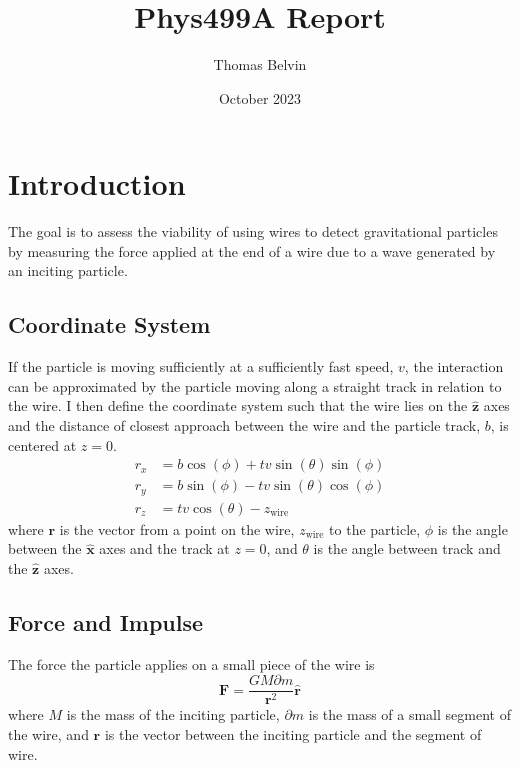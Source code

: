 \documentclass{report}
\title{Phys499A Report}
\author{Thomas Belvin}
\date{October 2023}
\begin{document}
\maketitle
\chapter*{Introduction}
The goal is to assess the viability of using wires to detect gravitational particles 
by measuring the force applied at the end of a wire due to a wave generated by an inciting
particle.
\section*{Coordinate System}
If the particle is moving sufficiently at a sufficiently fast speed, $v$, the interaction can be approximated by the 
particle moving along a straight track in relation to the wire. I then define the coordinate system
such that the wire lies on the $\mathbf{\hat z}$ axes and the distance of closest approach between the 
wire and the particle track, $b$, is centered at $z = 0$. 
\begin{align}
    r_x &= b \cos (\phi )+t v \sin (\theta ) \sin (\phi )\\
    r_y &= b \sin (\phi )-t v \sin (\theta ) \cos (\phi )\\
    r_z &= t v \cos (\theta )-z_{\text{wire}}
\end{align}
where $\mathbf{r}$ is the vector from a point on the wire, $z_{\text{wire}}$ to the particle, $\phi$ is the angle between
the $\mathbf{\hat x}$ axes and the track at $z = 0$, and $\theta$ is the angle between track and the $\mathbf{\hat z}$ axes.
\section*{Force and Impulse}
The force the particle applies on a small piece of the wire is
\begin{equation}
    \mathbf{F} = \frac{G M \partial m}{\mathbf{r}^2} \mathbf{\hat r}
\end{equation}
where $M$ is the mass of the inciting particle, $\partial m$ is the mass of a small segment of the wire,
and $\mathbf{r}$ is the vector between the inciting particle and the segment of wire.
\end{document}
